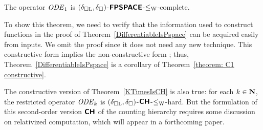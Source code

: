 \begin{theorem}
\label{theorem: C1 constructive}
The operator $\mathit{ODE} _1$ is $(\delta _{\square \mathrm L}, \delta _\square)$-$\text{\bfseries \sffamily \upshape FPSPACE}$-$\leq _{\mathrm W}$-complete.
\end{theorem}

To show this theorem,
we need to verify that the information used to construct functions in the proof of Theorem~\ref{DifferentiableIsPspace}
can be acquired easily from inputs.
We omit the proof since it does not need any new technique.
This constructive form implies the non-constructive form \cite[Lemmas 3.7 and 3.8]{kawamura2010operators}; 
thus, Theorem~\ref{DifferentiableIsPspace} is a corollary of 
Theorem~\ref{theorem: C1 constructive}.

The constructive version of Theorem~\ref{KTimesIsCH} is also true: 
for each $k \in \mathbf N$,
the restricted operator $\mathit{ODE} _k$ is 
$(\delta _{\square \mathrm L}, \delta _\square)$-$\text{\bfseries \sffamily \upshape CH}$-$\leq _{\mathrm W}$-hard.
But the formulation of this 
second-order version $\text{\bfseries \sffamily \upshape CH}$ of the counting hierarchy 
requires some discussion on relativized computation, 
which will appear in a forthcoming paper. 

